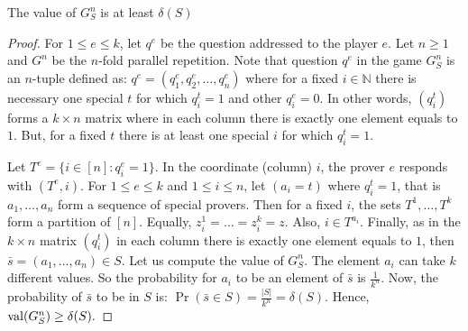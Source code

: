 \begin{pro}	 The value of $G_S^n$ is at least $\delta(S)$	  \label{pr3} \end{pro}

\begin{proof}
  For $1\leq e \leq k$, let $q^e$ be the question addressed to the player $e$. Let $n \geq 1$ and $G^n$ be the $n$-fold parallel repetition. Note that question $q^e$ in the game $G^n_S$ is an $n$-tuple defined as: $q^e=(q_1^e, q_2^e, \ldots, q_n^e)$ where for a fixed $i \in \mathbb{N}$ there is necessary  one special $t$ for which $q_i^t=1$ and other $q_i^e=0$.  In other words, $(q_i^t)$  forms a  $k \times n$ matrix where in each column there is exactly 
  one element equals to $1.$ But, for a fixed $t$ there is at least one special $i$ for which $q_i^t=1$. 

  Let  $T^e=\{i \in [n]: q_i^e=1\}$. In the coordinate (column) $i$, the prover $e$ responds with $(T^e,i).$ For $1\leq e \leq k$ and $1\leq i  \leq n$, let  $(a_i=t)$ where $q_i^t=1$, that is $a_1, \ldots, a_n$ form a sequence of special provers.  Then for a fixed $i$, the sets $T^1, \ldots, T^k$ form a partition of $[n].$ Equally, $z_i^1=\ldots=z_i^k=z.$
  Also, $i \in T^{a_i}$.
  Finally, as in the $k \times n$ matrix $(q_i^t)$ in each column there is exactly one element equals to $1$, then  $\bar{s}=(a_1, \ldots, a_n) \in S.$
  Let us compute the value of $G_S^n$. The element 
  $a_i$ can take $k$ different values. So the probability for $a_i$ to be an element of $\bar{s}$ is $\frac{1}{k^n}$. Now, the probability of $\bar{s}$ to be in $S$ is:  $\Pr (\bar{s} \in S)=  \frac{|S|}{k^n}=\delta(S).$ Hence, $\mathrm{val} (G_S^n) \geq \delta (S).$

\end{proof}




